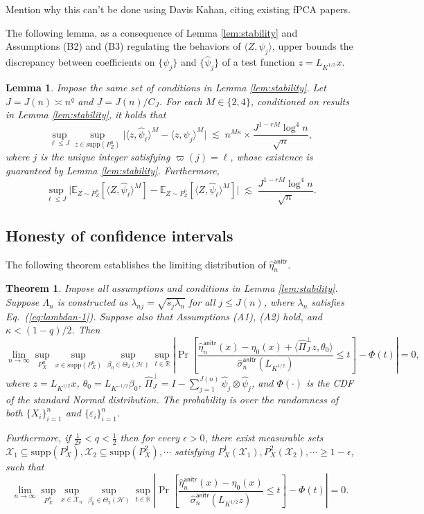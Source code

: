 \documentclass[11pt,a4paper]{article}
\renewcommand{\hat}{\widehat}
\theoremstyle{definition}
\theoremstyle{plain}
\newtheorem{theorem}{Theorem}[section]
\newtheorem{lemma}{Lemma}[section]
\theoremstyle{remark}
\newcommand{\supp}{\mathrm{supp}}
\newcommand{\mX}{\mathcal X}
\newcommand{\mH}{\mathcal H}
\newcommand{\anitr}{\mathsf{anitr}}
\newcommand{\und}{\underline}
\begin{document}
{\color{red} Mention why this can't be done using Davis Kahan, citing existing fPCA papers.}


The following lemma, as a consequence of Lemma \ref{lem:stability} and Assumptions (B2) and (B3) regulating the behaviors of $\langle Z,\psi_j\rangle$,
upper bounds the discrepancy between coefficients on $\{\psi_j\}$ and $\{\hat\psi_j\}$ of a test function $z=L_{K^{1/2}}x$.
\begin{lemma}
Impose the same set of conditions in Lemma \ref{lem:stability}.
Let $J=J(n)\asymp n^q$ and $\und J=J(n)/C_J$.
For each $M\in\{2,4\}$, conditioned on results in Lemma \ref{lem:stability},
it holds that
$$
\sup_{\ell\leq J}\sup_{z\in\supp(P_Z^n)}\big|\langle z,\hat\psi_\ell\rangle^M - \langle z,\psi_j\rangle^M\big|\; \lesssim\; n^{M\kappa}\times \frac{J^{1-rM}\log^4 n}{\sqrt{n}},
$$
where $j$ is the unique integer satisfying $\varpi(j)=\ell$, whose existence is guaranteed by Lemma \ref{lem:stability}.
Furthermore, 
$$
\sup_{\ell\leq J}\bigg|\mathbb E_{Z\sim P_Z^n}\left[\langle Z,\hat\psi_\ell\rangle^M\right] -\mathbb E_{Z\sim P_Z^n}\left[\langle Z,\hat\psi_\ell\rangle^M\right]\bigg|
\;\lesssim\;\frac{J^{1-rM}\log^4 n}{\sqrt{n}}.
$$
\label{lem:zpsi-stability}
\end{lemma}

\subsection{Honesty of confidence intervals}

The following theorem establishes the limiting distribution of $\hat\eta_n^\anitr$.
\begin{theorem}
Impose all assumptions and conditions in Lemma \ref{lem:stability}. Suppose $\Lambda_n$ is constructed as $\lambda_{nj}=\sqrt{\hat s_j\lambda_n}$ for all $j\leq J(n)$,
where $\lambda_n$ satisfies Eq.~(\ref{eq:lambdan-1}). Suppose also that Assumptions (A1), (A2) hold, and $\kappa<(1-q)/2$. Then 
$$
\lim_{n\to\infty} \sup_{P_X^n}\sup_{x\in\supp(P_X^n)}\sup_{\beta_0\in\Theta_2(\mH)}\sup_{t\in\mathbb R}\left|\Pr\left[\frac{\hat\eta_n^{\anitr}(x)-\eta_0(x)+\langle\hat\Pi_J^\perp z, \theta_0\rangle}{\hat\sigma_n^\anitr(L_{K^{1/2}})}\leq t\right] - \Phi(t)\right| = 0,
$$
where $z=L_{K^{1/2}}x$, $\theta_0=L_{K^{-1/2}}\beta_0$, $\hat\Pi_J^\perp = I - \sum_{j=1}^{J(n)}\hat\psi_j\otimes\hat\psi_j$, and $\Phi(\cdot)$ is the CDF of the standard Normal distribution.
The probability is over the randomness of both $\{X_i\}_{i=1}^n$ and $\{\varepsilon_i\}_{i=1}^n$. 

Furthermore, if $\frac{1}{2r}<q<\frac{1}{2}$ then for every $\epsilon>0$, there exist measurable sets $\mX_1\subseteq\supp(P_X^1),\mX_2\subseteq\supp(P_X^2),\cdots$ satisfying $P_X^1(\mX_1),P_X^2(\mX_2),\cdots\geq 1-\epsilon$,
such that
$$
\lim_{n\to\infty} \sup_{P_X^n}\sup_{x\in\mX_n}\sup_{\beta_0\in\Theta_2(\mH)}\sup_{t\in\mathbb R}\left|\Pr\left[\frac{\hat\eta_n^{\anitr}(x)-\eta_0(x)}{\hat\sigma_n^\anitr(L_{K^{1/2}}z)}\leq t\right] - \Phi(t)\right| = 0.
$$
\label{thm:anitr-limiting}
\end{theorem}
\end{document}
